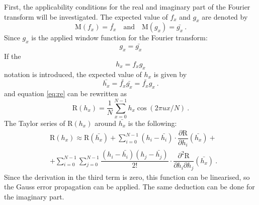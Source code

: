 \documentclass[a4paper,12pt,oneside]{article}
\newcommand{\R}{\mathrm{R}}
\begin{document}
First, the applicability conditions for the real and imaginary part of the Fourier transform will be investigated. The expected value of $f_x$ and $g_x$ are denoted by
$$ \mathrm{M}(f_x) = \bar{f_x} \quad \textrm{and} \quad \mathrm{M}(g_x) = \bar{g_x} \ .$$
Since $g_x$ is the applied window function for the Fourier transform:
$$ g_x = \bar{g_x} $$
If the
$$ h_x = f_x g_x $$
notation is introduced, the expected value of $h_x$ is given by
$$ \bar{h_x} = \bar{f_x}\bar{g_x} = \bar{f_x}g_x \ .$$
and equation \eqref{eq:re} can be rewritten as
\begin{equation}\label{eq:re2}
  \R(h_x) = \frac{1}{N} \sum\limits_{x=0}^{N-1} h_x \cos(2\pi ux/N) \ .
\end{equation}
The Taylor series of $\R(h_x)$ around $\bar{h_x}$ is the following:
\begin{eqnarray}
  & \R(h_x) \approx \R(\bar{h_x}) + 
  \sum\limits_{i=0}^{N-1} (h_i - \bar{h_i}) \cdot \dfrac{\partial \R}{\partial h_i}(\bar{h_x}) + \nonumber\\
  & + \sum\limits_{i=0}^{N-1}\sum\limits_{j=0}^{N-1} \dfrac{(h_i - \bar{h_i})(h_j - \bar{h_j})}{2!} \cdot
  \dfrac{\partial^2 \R}{\partial h_i \partial h_j}(\bar{h_x}) \ .
\end{eqnarray}
Since the derivation in the third term is zero, this function can be linearised, so the Gauss error propagation can be applied. The same deduction can be done for the imaginary part.
\end{document}
